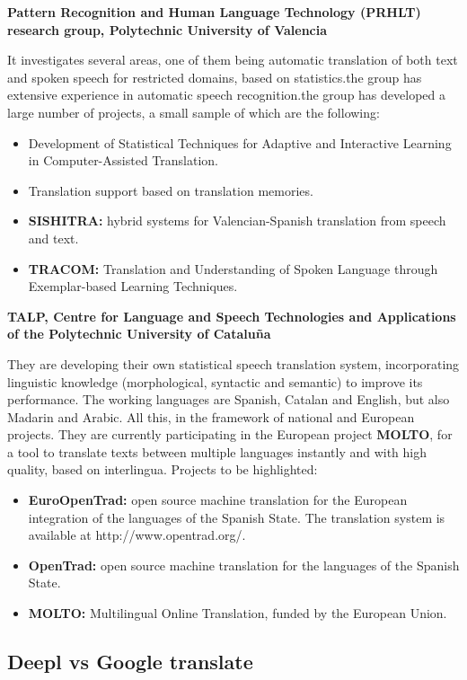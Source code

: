 \documentclass[a4paper]{article}
\theoremstyle{plain}
\theoremstyle{definition}
\begin{document}
\begin{flushleft}
    \textbf{Pattern Recognition and Human Language Technology (PRHLT) research group, Polytechnic University of Valencia}
    \begin{flushleft}
    It investigates several areas, one of them being automatic translation of both text and spoken speech for restricted domains, based on statistics.the group has extensive experience in automatic speech recognition.the group has developed a large number of projects, a small sample of which are the following:
     \begin{itemize}
    \item Development of Statistical Techniques for Adaptive and Interactive Learning in Computer-Assisted Translation.
    \item Translation support based on translation memories.
    \item \textbf{SISHITRA:} hybrid systems for Valencian-Spanish translation from speech and text.
    \item \textbf{TRACOM: }Translation and Understanding of Spoken Language through Exemplar-based Learning Techniques.
    \end{itemize}
    \end{flushleft}
    
    \textbf{TALP, Centre for Language and Speech Technologies and Applications of the Polytechnic University of Cataluña}
    \begin{flushleft}
    They are developing their own statistical speech translation system, incorporating linguistic knowledge (morphological, syntactic and semantic) to improve its performance. The working languages are Spanish, Catalan and English, but also Madarin and Arabic. All this, in the framework of national and European projects. They are currently participating in the European project \textbf{MOLTO}, for a tool to translate texts between multiple languages instantly and with high quality, based on interlingua. Projects to be highlighted:
    \begin{itemize}
        \item \textbf{EuroOpenTrad: }open source machine translation for the European integration of the languages of the Spanish State. The translation system is available at http://www.opentrad.org/.
        \item\textbf{OpenTrad: }open source machine translation for the languages of the Spanish State.
        \item \textbf{MOLTO: }Multilingual Online Translation, funded by the European Union.
    \end{itemize}

    \end{flushleft}
    \subsection{Deepl vs Google translate}
\end{flushleft}
\end{document}

